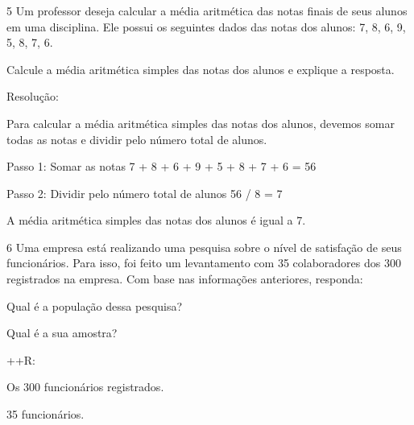\\
\\
\\
\\
\\
\\
\\
\\
\\
\\

\num{5} Um professor deseja calcular a média aritmética das notas finais de
seus alunos em uma disciplina. Ele possui os seguintes dados das notas
dos alunos: 7, 8, 6, 9, 5, 8, 7, 6.

Calcule a média aritmética simples das notas dos alunos e explique a
resposta.

Resolução:

Para calcular a média aritmética simples das notas dos alunos, devemos
somar todas as notas e dividir pelo número total de alunos.

Passo 1: Somar as notas 7 + 8 + 6 + 9 + 5 + 8 + 7 + 6 = 56

Passo 2: Dividir pelo número total de alunos 56 / 8 = 7

A média aritmética simples das notas dos alunos é igual a 7.

\num{6} Uma empresa está realizando uma pesquisa sobre o nível de satisfação
de seus funcionários. Para isso, foi feito um levantamento com 35
colaboradores dos 300 registrados na empresa. Com base nas informações
anteriores, responda:
\item Qual é a população dessa pesquisa?
\item Qual é a sua amostra?

++R:
\item Os 300 funcionários registrados.
\item 35 funcionários.

